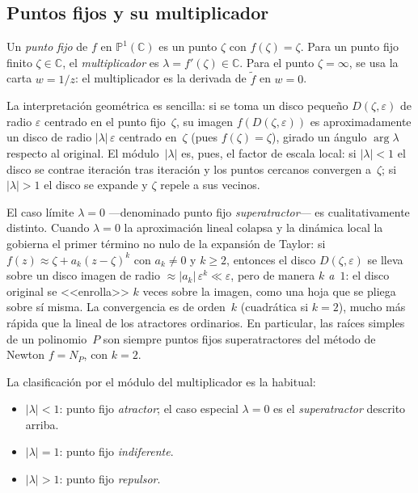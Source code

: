 \documentclass[11pt,a4paper]{article}
\theoremstyle{plain}
\theoremstyle{definition}
\theoremstyle{remark}
\newcommand{\C}{\mathbb{C}}
\newcommand{\Puno}{\mathbb{P}^1(\mathbb{C})}
\begin{document}
\subsection{Puntos fijos y su multiplicador}
\label{sec:pfijos}

Un \emph{punto fijo} de $f$ en $\Puno$ es un punto $\zeta$ con
$f(\zeta)=\zeta$.
Para un punto fijo finito $\zeta\in\C$, el \emph{multiplicador} es
$\lambda=f'(\zeta)\in\C$.
Para el punto $\zeta=\infty$, se usa la carta $w=1/z$: el multiplicador
es la derivada de $\tilde{f}$ en $w=0$.

La interpretación geométrica es sencilla: si se toma un disco pequeño
$D(\zeta,\varepsilon)$ de radio $\varepsilon$ centrado en el punto fijo~$\zeta$,
su imagen $f(D(\zeta,\varepsilon))$ es aproximadamente un disco de radio
$|\lambda|\,\varepsilon$ centrado en~$\zeta$ (pues $f(\zeta)=\zeta$),
girado un ángulo $\arg\lambda$ respecto al original.
El módulo~$|\lambda|$ es, pues, el factor de escala local:
si $|\lambda|<1$ el disco se contrae iteración tras iteración y
los puntos cercanos convergen a~$\zeta$;
si $|\lambda|>1$ el disco se expande y $\zeta$ repele a sus vecinos.

El caso límite $\lambda=0$ —denominado punto fijo \emph{superatractor}— es cualitativamente distinto.
Cuando $\lambda=0$ la aproximación lineal colapsa y la dinámica local
la gobierna el primer término no nulo de la expansión de Taylor:
si $f(z)\approx\zeta+a_k(z-\zeta)^k$ con $a_k\neq 0$ y $k\geq 2$,
entonces el disco $D(\zeta,\varepsilon)$ se lleva sobre un disco imagen de
radio $\approx|a_k|\,\varepsilon^k\ll\varepsilon$, pero de manera \emph{$k$ a~$1$}:
el disco original se <<enrolla>> $k$ veces sobre la imagen,
como una hoja que se pliega sobre sí misma.
La convergencia es de orden~$k$ (cuadrática si $k=2$), mucho más rápida
que la lineal de los atractores ordinarios.
En particular, las raíces simples de un polinomio~$P$ son siempre puntos
fijos superatractores del método de Newton $f=N_P$, con $k=2$.

La clasificación por el módulo del multiplicador es la habitual:
\begin{itemize}
  \item $|\lambda|<1$: punto fijo \emph{atractor}; el caso especial $\lambda=0$ es el \emph{superatractor} descrito arriba.
  \item $|\lambda|=1$: punto fijo \emph{indiferente}.
  \item $|\lambda|>1$: punto fijo \emph{repulsor}.
\end{itemize}
\end{document}

